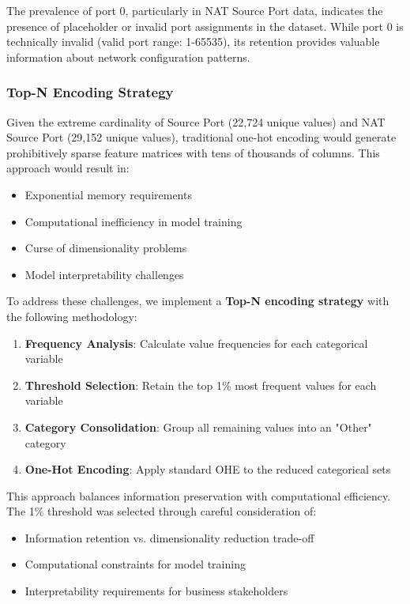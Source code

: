 \documentclass[12pt,a4paper]{article}
\begin{document}
The prevalence of port 0, particularly in NAT Source Port data, indicates the presence of placeholder or invalid port assignments in the dataset. While port 0 is technically invalid (valid port range: 1-65535), its retention provides valuable information about network configuration patterns.

\subsubsection{Top-N Encoding Strategy}

Given the extreme cardinality of Source Port (22,724 unique values) and NAT Source Port (29,152 unique values), traditional one-hot encoding would generate prohibitively sparse feature matrices with tens of thousands of columns. This approach would result in:

\begin{itemize}
    \item Exponential memory requirements
    \item Computational inefficiency in model training
    \item Curse of dimensionality problems
    \item Model interpretability challenges
\end{itemize}

To address these challenges, we implement a \textbf{Top-N encoding strategy} with the following methodology:

\begin{enumerate}
    \item \textbf{Frequency Analysis}: Calculate value frequencies for each categorical variable
    \item \textbf{Threshold Selection}: Retain the top 1\% most frequent values for each variable
    \item \textbf{Category Consolidation}: Group all remaining values into an "Other" category
    \item \textbf{One-Hot Encoding}: Apply standard OHE to the reduced categorical sets
\end{enumerate}

This approach balances information preservation with computational efficiency. The 1\% threshold was selected through careful consideration of:
\begin{itemize}
    \item Information retention vs. dimensionality reduction trade-off
    \item Computational constraints for model training
    \item Interpretability requirements for business stakeholders
\end{itemize}
\end{document}
